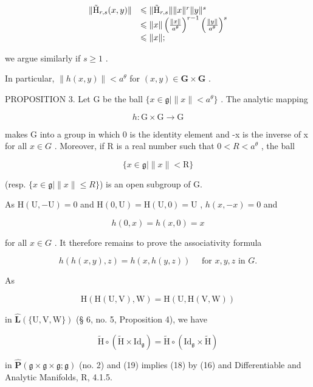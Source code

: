 \[
\begin{array}{r l} \| \tilde {\mathrm{H}} _ {r, s} (x, y) \| & \leqslant \| \tilde {\mathrm{H}} _ {r, s} \| \| x \| ^ {r} \| y \| ^ {s} \\ & \leqslant \| x \| \left(\frac {\| x \|}{a ^ {\theta}}\right) ^ {r - 1} \left(\frac {\| y \|}{a ^ {\theta}}\right) ^ {s} \\ & \leqslant \| x \|; \end{array}
\]

we argue similarly if \(s \geqslant 1\) .

In particular, \(\| h(x,y)\| < a^{\theta}\) for \((x,y)\in \mathbf{G}\times \mathbf{G}\) .

PROPOSITION 3. Let G be the ball \(\{x\in\mathfrak{g}\mid\|x\|<a^{\theta}\}\) . The analytic mapping

\[
h \colon \mathrm{G} \times \mathrm{G} \rightarrow \mathrm{G}
\]

makes G into a group in which 0 is the identity element and -x is the inverse of x for all \(x \in G\) . Moreover, if R is a real number such that \(0 < R < a^{\theta}\) , the ball

\[
\{x \in \mathfrak {g} | \| x \| <   \mathrm{R} \}
\]

(resp. \(\{x \in \mathfrak{g} \mid \|x\| \leqslant R\}\)) is an open subgroup of G.

As \(\mathrm{H}(\mathrm{U}, -\mathrm{U}) = 0\) and \(\mathrm{H}(0, \mathrm{U}) = \mathrm{H}(\mathrm{U}, 0) = \mathrm{U}\) , \(h(x, -x) = 0\) and

\[
h (0, x) = h (x, 0) = x
\]

for all \(x \in G\) . It therefore remains to prove the associativity formula

\[
h (h (x, y), z) = h (x, h (y, z)) \quad \text { for } x, y, z \text { in } G.\tag{18}
\]

As

\[
\mathrm{H} (\mathrm{H} (\mathrm{U}, \mathrm{V}), \mathrm{W}) = \mathrm{H} (\mathrm{U}, \mathrm{H} (\mathrm{V}, \mathrm{W}))
\]

in \(\hat{\mathbf{L}} (\{\mathrm{U},\mathrm{V},\mathrm{W}\})\) (§ 6, no. 5, Proposition 4), we have

\[
\tilde {\mathrm{H}} \circ (\tilde {\mathrm{H}} \times \mathrm{Id} _ {\mathfrak {g}}) = \tilde {\mathrm{H}} \circ (\mathrm{Id} _ {\mathfrak {g}} \times \tilde {\mathrm{H}})\tag{19}
\]

in \(\hat{\mathbf{P}} (\mathfrak{g}\times \mathfrak{g}\times \mathfrak{g};\mathfrak{g})\) (no. 2) and (19) implies (18) by (16) and Differentiable and Analytic Manifolds, R, 4.1.5.

